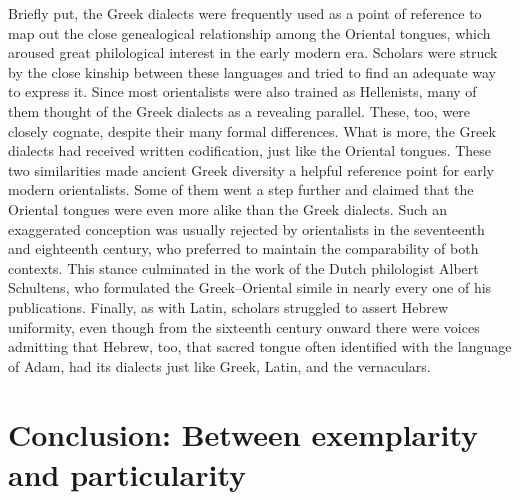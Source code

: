 Briefly put, the Greek dialects were frequently used as a point of reference to map out the close genealogical relationship among the Oriental tongues, which aroused great philological interest in the early modern era. Scholars were struck by the close kinship between these languages and tried to find an adequate way to express it. Since most orientalists were also trained as Hellenists, many of them thought of the Greek dialects as a revealing parallel. These, too, were closely cognate, despite their many formal differences. What is more, the Greek dialects had received written codification, just like the Oriental tongues. These two similarities made ancient Greek diversity a helpful reference point for early modern orientalists. Some of them went a step further and claimed that the Oriental tongues were even more alike than the Greek dialects. Such an exaggerated conception was usually rejected by orientalists in the seventeenth and eighteenth century, who preferred to maintain the comparability of both contexts. This stance culminated in the work of the Dutch philologist Albert Schultens, who formulated the Greek–Oriental simile in nearly every one of his publications. Finally, as with Latin, scholars struggled to assert Hebrew uniformity, even though from the sixteenth century onward there were voices admitting that Hebrew, too, that sacred tongue often identified with the language of Adam, had its dialects just like Greek, Latin, and the vernaculars.

\section{Conclusion: Between exemplarity and particularity}\label{sec:8.4}


